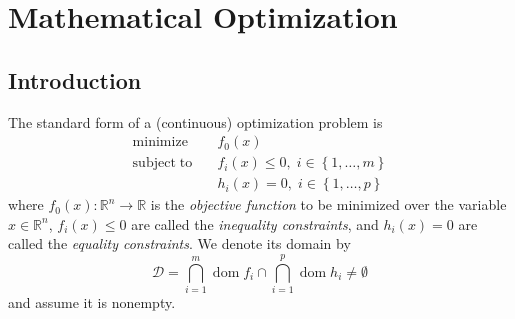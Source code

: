 
\chapter{Mathematical Optimization}

\section{Introduction}

The standard form of a (continuous) optimization problem is
\begin{align} \label{eq:op}
  \mathrm{minimize}   \quad & f_0(x) \nonumber \\
  \mathrm{subject\;to} \quad &
    f_i(x) \leq 0, \; i \in \left\{1, \dots, m \right\}\\
    & h_i(x) = 0, \; i \in \left\{1, \dots, p \right\} \nonumber
\end{align}
where $f_0(x): \mathbb{R}^n \rightarrow \mathbb{R}$ is the \emph{objective function} to be minimized over the variable $x \in \mathbb{R}^n$, $f_i(x) \leq 0$ are called the \emph{inequality constraints}, and $h_i(x) = 0$ are called the \emph{equality constraints}. We denote its domain by
\begin{equation}
\mathcal{D} = \bigcap_{i=1}^m \operatorname{dom} f_i \cap \bigcap_{i=1}^p \operatorname{dom} h_i \neq \emptyset
\end{equation}
and assume it is nonempty.


